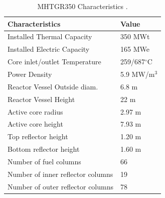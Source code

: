 \begin{table}[htbp!]
  \centering
    \caption{MHTGR350 Characteristics \cite{oecd_nea_benchmark_2017}.}
  \begin{tabular}{ll}
  \toprule
  Characteristics                   & Value               \\ \midrule
  Installed Thermal Capacity        & 350 MWt             \\
  Installed Electric Capacity       & 165 MWe             \\
  Core inlet/outlet Temperature     & 259/687$^{\circ}$C  \\
  Power Density                     & 5.9 MW/m$^3$        \\
  Reactor Vessel Outside diam.      & 6.8 m               \\
  Reactor Vessel Height             & 22 m                \\
  Active core radius                & 2.97 m              \\
  Active core height                & 7.93 m              \\
  Top reflector height              & 1.20 m              \\
  Bottom reflector height           & 1.60 m              \\
  Number of fuel columns            & 66                  \\
  Number of inner reflector columns & 19                  \\
  Number of outer reflector columns & 78                  \\
  \bottomrule
  \end{tabular}
  \label{tab:maincharac}
\end{table}

